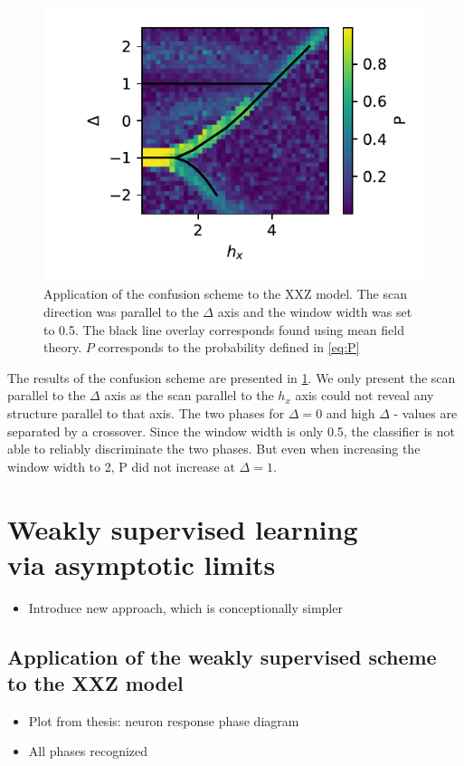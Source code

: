 \documentclass[prl, reprint, twocolumn]{revtex4-1}
\begin{document}
	\begin{figure}[h]
		\includegraphics[width=\columnwidth]{3_5_ConfusionPhaseDiagram2D_1_20181214}
		\caption{Application of the confusion scheme to the XXZ model. The scan direction was parallel to the $\Delta$ axis and the window width was set to 0.5. The black line overlay corresponds found using mean field theory\cite{Dmitriev2002}. $P$ corresponds to the probability defined in \ref{eq:P}}
		\label{fig:confusion}
	\end{figure}

	The results of the confusion scheme are presented in \ref{fig:confusion}. We only present the scan parallel to the $\Delta$ axis as the scan parallel to the $h_x$  axis could not reveal any structure parallel to that axis. The two phases for $\Delta = 0$ and high $\Delta$ - values are separated by a crossover. Since the window width is only 0.5, the classifier is not able to reliably discriminate the two phases. But even when increasing the window width to 2, P did not increase at $\Delta=1$.
	
	\section{Weakly supervised learning \\ via asymptotic limits}
	\begin{itemize}
		\item Introduce new approach, which is conceptionally simpler
	\end{itemize}
	\blindtext[2]
	
	
	
	\subsection{Application of the weakly supervised scheme \\ to the XXZ model}
	\begin{itemize}
		\item Plot from thesis: neuron response phase diagram
		\item All phases recognized
	\end{itemize}
	\blindtext[4]
	
\end{document}

